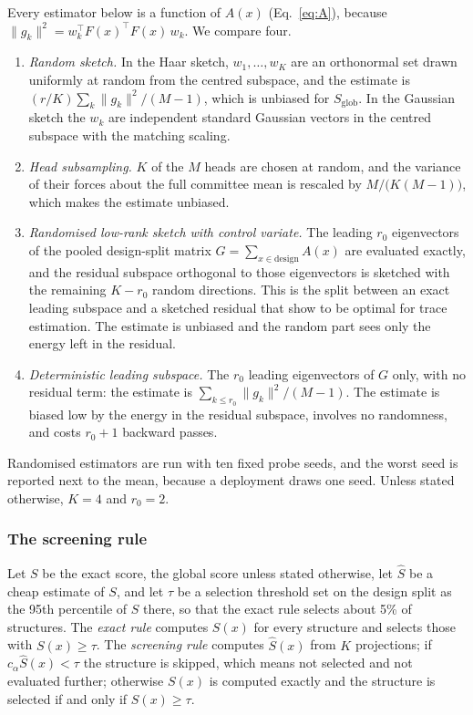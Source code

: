 Every estimator below is a function of $A(x)$ (Eq.~\ref{eq:A}), because
$\lVert g_k\rVert^2=w_k^{\top}F(x)^{\top}F(x)\,w_k$. We compare four.
\begin{enumerate}
\item \emph{Random sketch.} In the Haar sketch, $w_1,\dots,w_K$ are an
  orthonormal set drawn uniformly at random from the centred subspace, and the
  estimate is $(r/K)\sum_{k}\lVert g_k\rVert^2/(M-1)$, which is unbiased for
  $S_{\mathrm{glob}}$. In the Gaussian sketch the $w_k$ are independent
  standard Gaussian vectors in the centred subspace with the matching scaling.
\item \emph{Head subsampling.} $K$ of the $M$ heads are chosen at random, and
  the variance of their forces about the full committee mean is rescaled by
  $M/\bigl(K(M-1)\bigr)$, which makes the estimate unbiased.
\item \emph{Randomised low-rank sketch with control variate.} The leading
  $r_0$ eigenvectors of the pooled design-split matrix
  $G=\sum_{x\in\mathrm{design}}A(x)$ are evaluated exactly, and the residual
  subspace orthogonal to those eigenvectors is sketched with the remaining
  $K-r_0$ random directions. This is the split between an exact leading
  subspace and a sketched residual that \citet{meyer2021hutchpp} show to be
  optimal for trace estimation. The estimate is unbiased and the random part
  sees only the energy left in the residual.
\item \emph{Deterministic leading subspace.} The $r_0$ leading eigenvectors of
  $G$ only, with no residual term: the estimate is
  $\sum_{k\le r_0}\lVert g_k\rVert^2/(M-1)$. The estimate is biased low by the
  energy in the residual subspace, involves no randomness, and costs $r_0+1$
  backward passes.
\end{enumerate}
Randomised estimators are run with ten fixed probe seeds, and the worst seed
is reported next to the mean, because a deployment draws one seed. Unless
stated otherwise, $K=4$ and $r_0=2$.

\subsubsection{The screening rule}

Let $S$ be the exact score, the global score unless stated otherwise, let
$\hat S$ be a cheap estimate of $S$, and let $\tau$ be a selection threshold
set on the design split as the 95th percentile of $S$ there, so that the exact
rule selects about 5\% of structures. The \emph{exact rule} computes $S(x)$ for
every structure and selects those with $S(x)\ge\tau$. The \emph{screening rule}
computes $\hat S(x)$ from $K$ projections; if $c_\alpha\hat S(x)<\tau$ the
structure is skipped, which means not selected and not evaluated further;
otherwise $S(x)$ is computed exactly and the structure is selected if and only
if $S(x)\ge\tau$.

